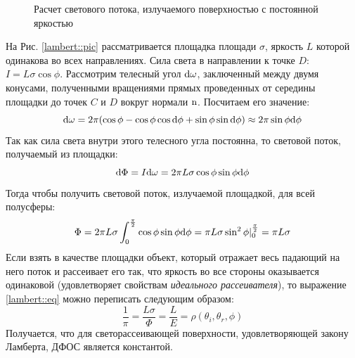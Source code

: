 \begin{figure}[h]
  \centering
  \caption{Расчет светового потока, излучаемого поверхностью с постоянной яркостью}
  \label{lambert::pic}
\end{figure}

На Рис. \eqref{lambert::pic} рассматривается площадка площади $\sigma$,
яркость $L$ которой одинакова во всех направлениях.
Сила света в направлении к точке $D$: $I=L\sigma\cos\phi$.
Рассмотрим телесный угол $\mathrm{d}\omega$, заключенный между двумя конусами,
полученными вращениями прямых проведенных от середины
площадки до точек $C$ и $D$ вокруг нормали $\mathrm{n}$. Посчитаем его значение:
$$\mathrm{d}\omega=2\pi(\cos\phi-\cos\phi\cos\mathrm{d}\phi+\sin\phi\sin\mathrm{d}\phi)\approx 2\pi\sin\phi\mathrm{d}\phi$$
Так как сила света внутри этого телесного угла постоянна, то световой поток, получаемый из площадки:
$$\mathrm{d}\Phi=I\mathrm{d}\omega=2\pi L\sigma\cos\phi\sin\phi\mathrm{d}\phi$$
Тогда чтобы получить световой поток, излучаемой площадкой, для всей полусферы:
\begin{equation}\label{lambert::eq}
  \Phi=2\pi L\sigma\int_0^{\frac{\pi}{2}} \cos\phi\sin\phi\mathrm{d}\phi=\pi L\sigma\sin^2\phi\vert_0^\frac{\pi}{2}=\pi L\sigma
\end{equation}
Если взять в качестве площадки объект, который отражает весь падающий на него поток
и рассеивает его так, что яркость во все стороны оказывается одинаковой (удовлетворяет свойствам
\textit{идеального рассеивателя}), то выражение \eqref{lambert::eq} можно
переписать следующим образом:
$$\frac{1}{\pi}=\frac{L\sigma}{\Phi}=\frac{L}{E}=\rho(\theta_i,\theta_r,\phi)$$
Получается, что для светорассеивающей поверхности, удовлетворяющей закону Ламберта, ДФОС
является константой.

